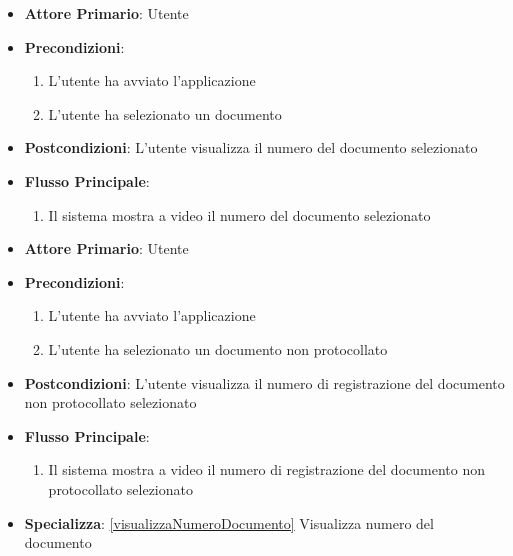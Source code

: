 \begin{itemize}
    \item \textbf{Attore Primario}: Utente
    \item \textbf{Precondizioni}:
    \begin{enumerate}
        \item L'utente ha avviato l'applicazione
        \item L'utente ha selezionato un documento
    \end{enumerate}
    \item \textbf{Postcondizioni}: L'utente visualizza il numero del documento selezionato
    \item \textbf{Flusso Principale}:
        \begin{enumerate}
            \item Il sistema mostra a video il numero del documento selezionato
        \end{enumerate}
\end{itemize}

\begin{itemize}
\item \textbf{Attore Primario}: Utente
    \item \textbf{Precondizioni}:
    \begin{enumerate}
        \item L'utente ha avviato l'applicazione
        \item L'utente ha selezionato un documento non protocollato
    \end{enumerate}
    \item \textbf{Postcondizioni}: L'utente visualizza il numero di registrazione del documento non protocollato selezionato
    \item \textbf{Flusso Principale}:
        \begin{enumerate}
            \item Il sistema mostra a video il numero di registrazione del documento non protocollato selezionato
        \end{enumerate}
    \item \textbf{Specializza}: \ref{visualizzaNumeroDocumento} Visualizza numero del documento
\end{itemize}

